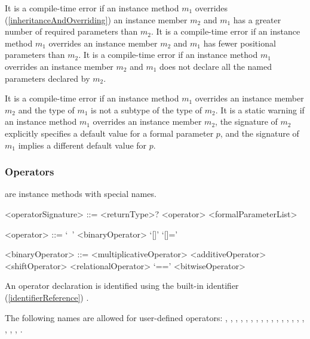 \documentclass[makeidx]{article}
\begin{document}
\LMHash{}%
It is a compile-time error if an instance method $m_1$ overrides (\ref{inheritanceAndOverriding}) an instance member $m_2$ and $m_1$ has a greater number of required parameters than $m_2$.
It is a compile-time error if an instance method $m_1$ overrides an instance member $m_2$ and $m_1$ has fewer positional parameters than $m_2$.
It is a compile-time error if an instance method $m_1$ overrides an instance member $m_2$ and $m_1$ does not declare all the named parameters declared by $m_2$.

\LMHash{}%
It is a compile-time error if an instance method $m_1$ overrides an instance member $m_2$ and the type of $m_1$ is not a subtype of the type of $m_2$.
It is a static warning if
an instance method $m_1$ overrides an instance member $m_2$,
the signature of $m_2$ explicitly specifies a default value
for a formal parameter $p$, and
the signature of $m_1$ implies a different default value for $p$.



\subsubsection{Operators}

\LMHash{}%
 are instance methods with special names.

\begin{grammar}
<operatorSignature> ::= \gnewline{}
  <returnType>? \OPERATOR{} <operator> <formalParameterList>

<operator> ::= `~'
  \alt <binaryOperator>
  \alt `[]'
  \alt `[]='

<binaryOperator> ::= <multiplicativeOperator>
  \alt <additiveOperator>
  \alt <shiftOperator>
  \alt <relationalOperator>
  \alt `=='
  \alt <bitwiseOperator>
\end{grammar}

\LMHash{}%
An operator declaration is identified using the built-in identifier (\ref{identifierReference}) \OPERATOR{}.

\LMHash{}%
The following names are allowed for user-defined operators:
,
,
,
,
,
,
,
,
,
,
,
,
,
,
,
,
,
,
,
.
\end{document}
